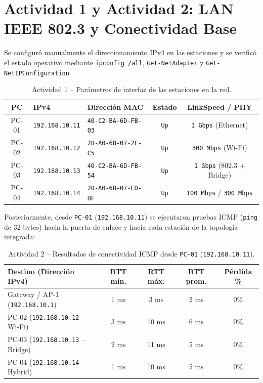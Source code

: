 \documentclass[11pt, a4paper]{article}
\begin{document}
\section{Actividad 1 y Actividad 2: LAN IEEE 802.3 y Conectividad Base}

Se configuró manualmente el direccionamiento IPv4 en las estaciones y se verificó el estado operativo mediante \texttt{ipconfig /all}, \texttt{Get-NetAdapter} y \texttt{Get-NetIPConfiguration}.

\begin{table}[h!]
\centering
\small
\setlength{\tabcolsep}{4pt}
\caption{Actividad 1 -- Parámetros de interfaz de las estaciones en la red.}
\begin{tabularx}{\textwidth}{c >{\centering\arraybackslash}X >{\centering\arraybackslash}X c c}
\toprule
\textbf{PC} & \textbf{IPv4} & \textbf{Dirección MAC} & \textbf{Estado} & \textbf{LinkSpeed / PHY} \\
\midrule
PC-01 & \texttt{192.168.10.11} & \texttt{40-C2-BA-6D-FB-03} & \texttt{Up} & \texttt{1 Gbps} (Ethernet) \\
PC-02 & \texttt{192.168.10.12} & \texttt{28-A0-6B-07-2E-C5} & \texttt{Up} & \texttt{300 Mbps} (Wi-Fi) \\
PC-03 & \texttt{192.168.10.13} & \texttt{40-C2-BA-6D-FB-54} & \texttt{Up} & \texttt{1 Gbps} (802.3 + Bridge) \\
PC-04 & \texttt{192.168.10.14} & \texttt{28-A0-6B-07-ED-BF} & \texttt{Up} & \texttt{100 Mbps} / \texttt{300 Mbps} \\
\bottomrule
\end{tabularx}
\end{table}

Posteriormente, desde \texttt{PC-01} (\texttt{192.168.10.11}) se ejecutaron pruebas ICMP (\texttt{ping} de 32 bytes) hacia la puerta de enlace y hacia cada estación de la topología integrada:

\begin{table}[h!]
\centering
\small
\setlength{\tabcolsep}{4.5pt}
\caption{Actividad 2 -- Resultados de conectividad ICMP desde \texttt{PC-01} (\texttt{192.168.10.11}).}
\begin{tabularx}{\textwidth}{>{\raggedright\arraybackslash}X c c c c}
\toprule
\textbf{Destino (Dirección IPv4)} & \textbf{RTT mín.} & \textbf{RTT máx.} & \textbf{RTT prom.} & \textbf{Pérdida \%} \\
\midrule
Gateway / AP-1 (\texttt{192.168.10.1}) & 1 ms & 3 ms  & 2 ms & 0\% \\
PC-02 (\texttt{192.168.10.12} -- Wi-Fi) & 3 ms & 10 ms & 6 ms & 0\% \\
PC-03 (\texttt{192.168.10.13} -- Bridge) & 2 ms & 11 ms & 5 ms & 0\% \\
PC-04 (\texttt{192.168.10.14} -- Hybrid) & 1 ms & 10 ms & 5 ms & 0\% \\
\bottomrule
\end{tabularx}
\end{table}
\end{document}
